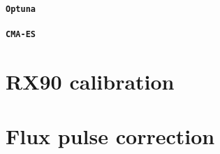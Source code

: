 \paragraph{\tt{Optuna}}
\cite{optuna_2019}

\paragraph{\tt{CMA-ES}}
\cite{cmaessimplepractical}

\section{RX90 calibration}

\section{Flux pulse correction}
